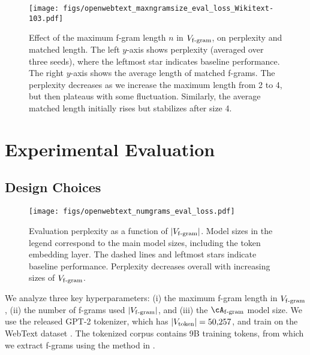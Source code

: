 \begin{figure}[t]
    \centering
    \texttt{[image: figs/openwebtext\_maxngramsize\_eval\_loss\_Wikitext-103.pdf]}
    \caption{Effect of the maximum f-gram length $n$ in $V_{\mathrm{f\text{-}gram}}$, on perplexity and matched length. The left $y$-axis shows perplexity (averaged over three seeds), where the leftmost star indicates baseline performance. The right $y$-axis shows the average length of matched f-grams. The perplexity decreases as we increase the maximum length from 2 to 4, but then plateaus with some fluctuation. Similarly, the average matched length initially rises but stabilizes after size 4.}
    \label{fig:scale_max_ngram_size}
\end{figure}

\section{Experimental Evaluation}\label{sec:exps_openwebtext}

\subsection{Design Choices}

\begin{figure*}[t]
    \centering
    \texttt{[image: figs/openwebtext\_numgrams\_eval\_loss.pdf]}
    \caption{Evaluation perplexity as a function of $|V_{\mathrm{f\text{-}gram}}|$. Model sizes in the legend correspond to the main model sizes, including the token embedding layer. The dashed lines and leftmost stars indicate baseline performance.  Perplexity decreases overall with increasing sizes of $V_{\mathrm{f\text{-}gram}}$. }

    \label{fig:scale_num_ngrams}
\end{figure*}

We analyze three key hyperparameters: (i) the maximum f-gram length in $V_{\mathrm{f\text{-}gram}}$, (ii) the number of f-grams used $|V_{\mathrm{f\text{-}gram}}|$, and (iii) the $\Afgram$ model size. We use the released GPT-2 tokenizer, which has $|V_{\mathrm{token}}| = 50,\!257$, and train on the WebText dataset \citep{openwebtext}. The tokenized corpus  contains 9B training tokens, from which we extract f-grams using the method in .


